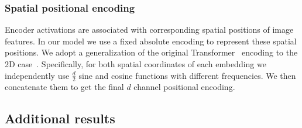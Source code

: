 \subsubsection{Spatial positional encoding}

Encoder activations are associated with corresponding spatial positions of image features. In our model we use a fixed absolute encoding to represent these spatial positions. We adopt a generalization of the original Transformer~\cite{Vaswani2017AttentionIA} encoding to the 2D case~\cite{Parmar2018ImageT}. Specifically, for both spatial coordinates of each embedding we independently use $\frac{d}{2}$ sine and cosine functions with different frequencies. We then concatenate them to get the final $d$ channel positional encoding.



\subsection{Additional results}

